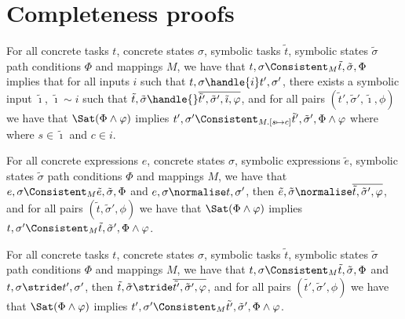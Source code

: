 
\section{Completeness proofs}
\label{sec:completenessproofs}

\begin{lemma}
  \label{lem:completeHandle}
  For all concrete tasks $t$, concrete states $\sigma$, symbolic tasks $\tilde{t}$, symbolic states $\tilde{\sigma}$ path conditions $\Phi$ and mappings $M$,
  we have that $t,\sigma\Consistent_{M}\tilde{t},\tilde{\sigma},\Phi$ implies
  that for all inputs $i$ such that $t,\sigma\handle{i}t',\sigma'$,
  there exists a symbolic input $\tilde{\imath}$, $\tilde{\imath}\sim i$ such that
  $\tilde{t},\tilde{\sigma}\handle{}\overline{\tilde{t}',\tilde{\sigma}',\tilde{\imath},\phi}$,
  and for all pairs $(\tilde{t}',\tilde{\sigma}',\tilde{\imath},\phi)$ we have that $\Sat(\Phi\land\phi)$ implies $t',\sigma'\Consistent_{M.[s\mapsto c]}\tilde{t}',\tilde{\sigma}',\Phi\land\phi$ where where $s\in\tilde{\imath}$ and $c\in i$.
\end{lemma}

\begin{lemma}
  \label{lem:completeNormalise}
  For all concrete expressions $e$, concrete states $\sigma$, symbolic expressions $\tilde{e}$, symbolic states $\tilde{\sigma}$ path conditions $\Phi$ and mappings $M$,
  we have that $e,\sigma\Consistent_{M}\tilde{e},\tilde{\sigma},\Phi$
  and $e,\sigma\normalise t,\sigma'$,
  then $\tilde{e},\tilde{\sigma}\normalise\overline{\tilde{t},\tilde{\sigma}',\phi}$,
  and for all pairs $(\tilde{t},\tilde{\sigma}',\phi)$ we have that $\Sat(\Phi\land\phi)$ implies $t,\sigma'\Consistent_{M}\tilde{t},\tilde{\sigma}',\Phi\land\phi$.
\end{lemma}

\begin{lemma}
  \label{lem:completeStride}
  For all concrete tasks $t$, concrete states $\sigma$, symbolic tasks $\tilde{t}$, symbolic states $\tilde{\sigma}$ path conditions $\Phi$ and mappings $M$,
  we have that $t,\sigma\Consistent_{M}\tilde{t},\tilde{\sigma},\Phi$
  and $t,\sigma\stride t',\sigma'$,
  then $\tilde{t},\tilde{\sigma}\stride\overline{\tilde{t'},\tilde{\sigma}',\phi}$,
  and for all pairs $(\tilde{t'},\tilde{\sigma}',\phi)$ we have that $\Sat(\Phi\land\phi)$ implies $t',\sigma'\Consistent_{M}\tilde{t'},\tilde{\sigma}',\Phi\land\phi$.
\end{lemma}

